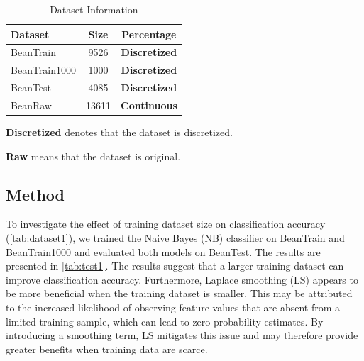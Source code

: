 \documentclass[10pt,a4paper]{article}
\begin{document}
		\begin{table}[htbp]
			\centering
			\caption{Dataset Information}
			\label{tab:dataset1}
			\begin{threeparttable}
				\begin{tabular}{lcc}
					\toprule
					\textbf{Dataset} & \textbf{Size} & \textbf{Percentage} \\
					\midrule
					BeanTrain      & 9526  & \textbf{Discretized} \\
					BeanTrain1000  & 1000  & \textbf{Discretized} \\
					BeanTest       & 4085  & \textbf{Discretized} \\
					BeanRaw        & 13611 & \textbf{Continuous} \\
					\bottomrule
				\end{tabular}
				\begin{tablenotes}[flushleft]
					\footnotesize
					\item \textbf{Discretized} denotes that the dataset is discretized.
					\item \textbf{Raw} means that the dataset is original.
				\end{tablenotes}
			\end{threeparttable}
		\end{table}
	
	\subsection{Method}
	To investigate the effect of training dataset size on classification accuracy (\autoref{tab:dataset1}), we trained the Naive Bayes (NB) classifier on BeanTrain and BeanTrain1000 and evaluated both models on BeanTest. The results are presented in \autoref{tab:test1}. The results suggest that a larger training dataset can improve classification accuracy. Furthermore, Laplace smoothing (LS) appears to be more beneficial when the training dataset is smaller. This may be attributed to the increased likelihood of observing feature values that are absent from a limited training sample, which can lead to zero probability estimates. By introducing a smoothing term, LS mitigates this issue and may therefore provide greater benefits when training data are scarce.
	
\end{document}
